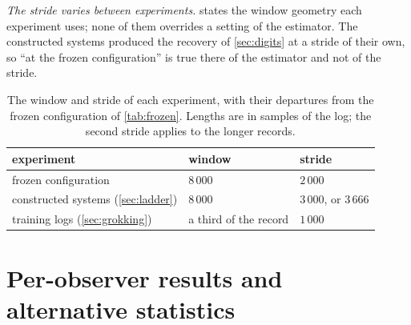 \documentclass{article}
\begin{document}
\emph{The stride varies between experiments.}  states the window geometry each
experiment uses; none of them overrides a setting of the estimator. The constructed systems
produced the recovery of \cref{sec:digits} at a stride of their own, so ``at the frozen
configuration'' is true there of the estimator and not of the stride.

\begin{table}[H]
\centering
\caption{The window and stride of each experiment, with their departures from the frozen
configuration of \cref{tab:frozen}. Lengths are in samples of the log; the second stride applies to
the longer records.}
\label{tab:geometry}
\begin{tabular}{lll}
\toprule
experiment & window & stride \\
\midrule
frozen configuration                     & $8\,000$              & $2\,000$ \\
constructed systems (\cref{sec:ladder})  & $8\,000$              & $3\,000$, or $3\,666$ \\
training logs (\cref{sec:grokking})      & a third of the record & $1\,000$ \\
\bottomrule
\end{tabular}
\end{table}

\section{Per-observer results and alternative statistics}\label{app:nulls}
\end{document}
